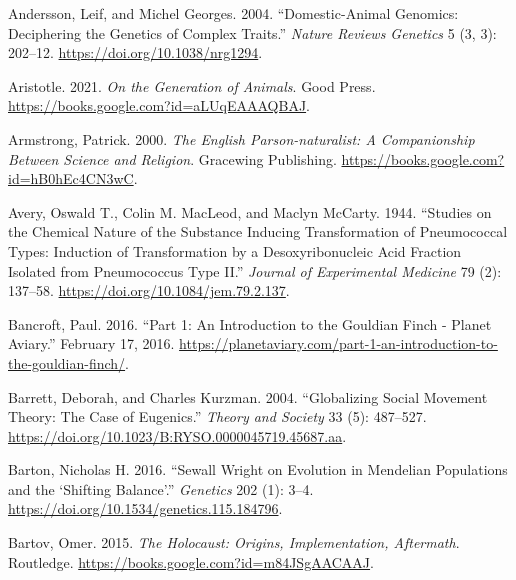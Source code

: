 \documentclass[
]{book}
\newlength{\cslhangindent}
\newlength{\cslentryspacingunit} %
\newenvironment{CSLReferences}[2] %
 {%
  \setlength{\parindent}{0pt}
  \ifodd #1
  \let\oldpar\par
  \def\par{\hangindent=\cslhangindent\oldpar}
  \fi
  \setlength{\parskip}{#2\cslentryspacingunit}
 }%
 {}
\begin{document}
\begin{CSLReferences}{1}{0}
\leavevmode{}%
Andersson, Leif, and Michel Georges. 2004. {``Domestic-Animal Genomics: Deciphering the Genetics of Complex Traits.''} \emph{Nature Reviews Genetics} 5 (3, 3): 202--12. \url{https://doi.org/10.1038/nrg1294}.

\leavevmode{}%
Aristotle. 2021. \emph{On the {Generation} of {Animals}}. {Good Press}. \url{https://books.google.com?id=aLUqEAAAQBAJ}.

\leavevmode{}%
Armstrong, Patrick. 2000. \emph{The {English Parson-naturalist}: {A Companionship Between Science} and {Religion}}. {Gracewing Publishing}. \url{https://books.google.com?id=hB0hEc4CN3wC}.

\leavevmode{}%
Avery, Oswald T., Colin M. MacLeod, and Maclyn McCarty. 1944. {``Studies on the Chemical Nature of the Substance Inducing Transformation of Pneumococcal Types: {Induction} of Transformation by a Desoxyribonucleic Acid Fraction Isolated from Pneumococcus Type {II}.''} \emph{Journal of Experimental Medicine} 79 (2): 137--58. \url{https://doi.org/10.1084/jem.79.2.137}.

\leavevmode{}%
Bancroft, Paul. 2016. {``Part 1: {An} Introduction to the {Gouldian} Finch - {Planet Aviary}.''} February 17, 2016. \url{https://planetaviary.com/part-1-an-introduction-to-the-gouldian-finch/}.

\leavevmode{}%
Barrett, Deborah, and Charles Kurzman. 2004. {``Globalizing Social Movement Theory: {The} Case of Eugenics.''} \emph{Theory and Society} 33 (5): 487--527. \url{https://doi.org/10.1023/B:RYSO.0000045719.45687.aa}.

\leavevmode{}%
Barton, Nicholas H. 2016. {``Sewall {Wright} on {Evolution} in {Mendelian Populations} and the {`{Shifting Balance}'}.''} \emph{Genetics} 202 (1): 3--4. \url{https://doi.org/10.1534/genetics.115.184796}.

\leavevmode{}%
Bartov, Omer. 2015. \emph{The {Holocaust}: {Origins}, {Implementation}, {Aftermath}}. {Routledge}. \url{https://books.google.com?id=m84JSgAACAAJ}.


\end{CSLReferences}
\end{document}
